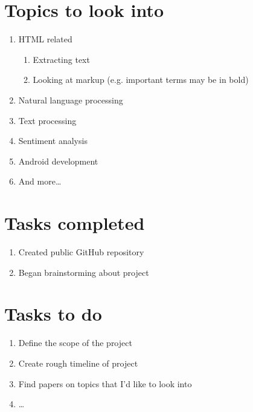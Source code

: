 \documentclass[11pt,a4paper]{article}
\begin{document}
\section{Topics to look into}
\begin{enumerate}
\item HTML related
 \begin{enumerate}
 \item Extracting text
 \item Looking at markup (e.g. important terms may be in bold)
 \end{enumerate}
\item Natural language processing
\item Text processing
\item Sentiment analysis
\item Android development
\item And more\ldots
\end{enumerate}

\section{Tasks completed}
\begin{enumerate}
\item Created public GitHub repository
\item Began brainstorming about project
\end{enumerate}

\section{Tasks to do}
\begin{enumerate}
\item Define the scope of the project
\item Create rough timeline of project
\item Find papers on topics that I'd like to look into
\item \ldots

\end{enumerate}
\end{document}
